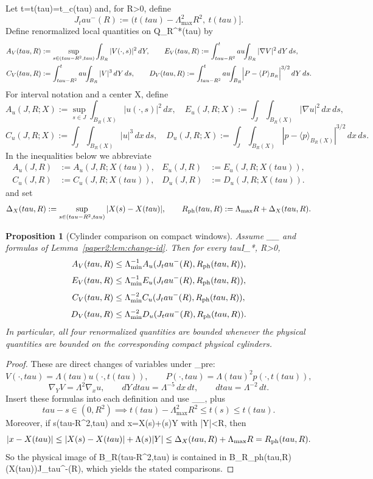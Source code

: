 \documentclass[11pt]{amsart}
\def\({}%
\def\){}%
\def\tau{tau}%
\theoremstyle{plain}
\newtheorem{proposition}[proposition]{Proposition}
\theoremstyle{definition}
\theoremstyle{remark}
\begin{document}
Let \(t=t(\tau)=t_{\rm c}(\tau)\) and, for \(R>0\), define
\[
J_\tau^{-}(R):=\bigl(t(\tau)-\Lambda_{\max}^{2}R^2,\ t(\tau)\bigr].
\]
Define renormalized local quantities on \(Q_R^*(\tau)\) by
\[
\begin{aligned}
A_V(\tau,R)&:=\sup_{s\in(\tau-R^2,\tau)}\int_{B_R}|V(\cdot,s)|^2\,dY,\qquad
E_V(\tau,R):=\int_{\tau-R^2}^\tau\!\!\int_{B_R}|\nabla V|^2\,dY\,d s,\\
C_V(\tau,R)&:=\int_{\tau-R^2}^\tau\!\!\int_{B_R}|V|^3\,dY\,d s,\qquad
D_V(\tau,R):=\int_{\tau-R^2}^\tau\!\!\int_{B_R}\Bigl|P-\langle P\rangle_{B_R}\Bigr|^{3/2}\,dY\,d s.
\end{aligned}
\]
For interval notation and a center \(X\), define
\[
A_u(J,R;X):=\sup_{s\in J}\int_{B_R(X)}|u(\cdot,s)|^2\,dx,\quad
E_u(J,R;X):=\int_J\int_{B_R(X)}|\nabla u|^2\,dx\,ds,
\]
\[
C_u(J,R;X):=\int_J\int_{B_R(X)}|u|^3\,dx\,ds,\quad
D_u(J,R;X):=\int_J\int_{B_R(X)}|p-\langle p\rangle_{B_R(X)}|^{3/2}\,dx\,ds.
\]
In the inequalities below we abbreviate
\[
\begin{aligned}
A_u(J,R)&:=A_u(J,R;X(\tau)),& E_u(J,R)&:=E_u(J,R;X(\tau)),\\
C_u(J,R)&:=C_u(J,R;X(\tau)),& D_u(J,R)&:=D_u(J,R;X(\tau)).
\end{aligned}
\]
and set
\[
\Delta_X(\tau,R):=\sup_{s\in(\tau-R^2,\tau)}|X(s)-X(\tau)|,
\qquad
R_{\rm ph}(\tau,R):=\Lambda_{\max}R+\Delta_X(\tau,R).
\]

\begin{proposition}[Cylinder comparison on compact windows]\label{paper2:prop:local-transfer}
Assume \(\Lambda_{\min}\le \Lambda\le \Lambda_{\max}\) and formulas of
Lemma~\ref{paper2:lem:change-id}.
Then for every \(\tau\in I_*\), \(R>0\),
\[
A_V(\tau,R)\le \Lambda_{\min}^{-1}A_u(J_\tau^{-}(R),R_{\rm ph}(\tau,R)),
\]
\[
E_V(\tau,R)\le \Lambda_{\min}^{-1}E_u(J_\tau^{-}(R),R_{\rm ph}(\tau,R)),
\]
\[
C_V(\tau,R)\le \Lambda_{\min}^{-2}C_u(J_\tau^{-}(R),R_{\rm ph}(\tau,R)),
\]
\[
D_V(\tau,R)\le \Lambda_{\min}^{-2}D_u(J_\tau^{-}(R),R_{\rm ph}(\tau,R)).
\]
In particular, all four renormalized quantities are bounded whenever the physical
quantities are bounded on the corresponding compact physical cylinders.
\end{proposition}

\begin{proof}
These are direct changes of variables under \(\Phi_{\rm pre}\):
\[
V(\cdot,\tau)=\Lambda(\tau)u(\cdot,t(\tau)),\qquad
P(\cdot,\tau)=\Lambda(\tau)^2 p(\cdot,t(\tau)),
\]
\[
\nabla_YV=\Lambda^2\nabla_xu,\qquad dY\,d\tau=\Lambda^{-5}\,dx\,dt,\qquad
d\tau=\Lambda^{-2}\,dt.
\]
Insert these formulas into each definition and use
\(\Lambda_{\min}\le\Lambda\le\Lambda_{\max}\), plus
\[
\tau-s\in(0,R^2)\implies t(\tau)-\Lambda_{\max}^{2}R^2\le t(s)\le t(\tau).
\]
Moreover, if \(s\in(\tau-R^2,\tau)\) and \(x=X(s)+\Lambda(s)Y\) with \(|Y|<R\), then
\[
|x-X(\tau)|\le |X(s)-X(\tau)|+\Lambda(s)|Y|
\le \Delta_X(\tau,R)+\Lambda_{\max}R
=R_{\rm ph}(\tau,R).
\]
So the physical image of \(B_R\times(\tau-R^2,\tau)\) is contained in
\(B_{R_{\rm ph}(\tau,R)}(X(\tau))\times J_\tau^{-}(R)\), which yields the
stated comparisons.
\end{proof}
\end{document}
